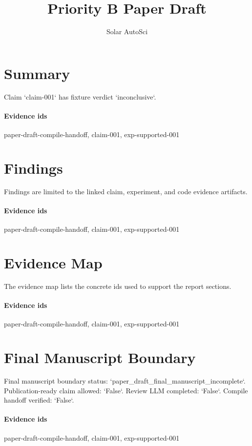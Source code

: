 \documentclass{article}
\title{Priority B Paper Draft}
\author{Solar AutoSci}
\date{}
\begin{document}
\maketitle

\section{Summary}
Claim `claim-001` has fixture verdict `inconclusive`.

\paragraph{Evidence ids} paper-draft-compile-handoff, claim-001, exp-supported-001

\section{Findings}
Findings are limited to the linked claim, experiment, and code evidence artifacts.

\paragraph{Evidence ids} paper-draft-compile-handoff, claim-001, exp-supported-001

\section{Evidence Map}
The evidence map lists the concrete ids used to support the report sections.

\paragraph{Evidence ids} paper-draft-compile-handoff, claim-001, exp-supported-001

\section{Final Manuscript Boundary}
Final manuscript boundary status: `paper\_draft\_final\_manuscript\_incomplete`. Publication-ready claim allowed: `False`. Review LLM completed: `False`. Compile handoff verified: `False`.

\paragraph{Evidence ids} paper-draft-compile-handoff, claim-001, exp-supported-001
\end{document}

